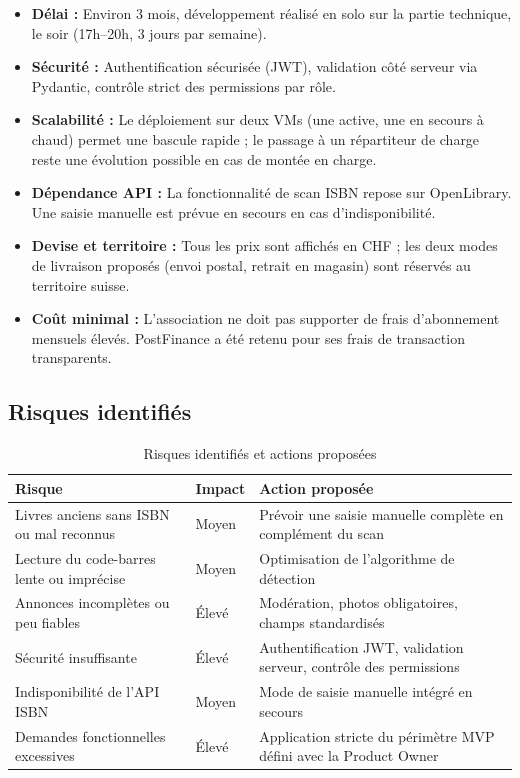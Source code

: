\documentclass[12pt, a4paper]{report}
\renewcommand{\_}{\origunderscore\allowbreak}
\begin{document}
\begin{itemize}
    \item \textbf{Délai :} Environ 3 mois, développement réalisé en solo sur la partie technique, le soir (17h–20h, 3 jours par semaine).
    \item \textbf{Sécurité :} Authentification sécurisée (JWT), validation côté serveur via Pydantic, contrôle strict des permissions par rôle.
    \item \textbf{Scalabilité :} Le déploiement sur deux VMs (une active, une en secours à chaud) permet une bascule rapide ; le passage à un répartiteur de charge reste une évolution possible en cas de montée en charge.
    \item \textbf{Dépendance API :} La fonctionnalité de scan ISBN repose sur OpenLibrary. Une saisie manuelle est prévue en secours en cas d'indisponibilité.
    \item \textbf{Devise et territoire :} Tous les prix sont affichés en CHF ; les deux modes de livraison proposés (envoi postal, retrait en magasin) sont réservés au territoire suisse.
    \item \textbf{Coût minimal :} L'association ne doit pas supporter de frais d'abonnement mensuels élevés. PostFinance a été retenu pour ses frais de transaction transparents.
\end{itemize}

\subsection{Risques identifiés}

\begin{table}[h]
\centering
\renewcommand{\arraystretch}{1.4}
\begin{tabular}{@{}p{4cm}p{2.5cm}p{6.5cm}@{}}
\toprule
\textbf{Risque} & \textbf{Impact} & \textbf{Action proposée} \\
\midrule
Livres anciens sans ISBN ou mal reconnus & Moyen & Prévoir une saisie manuelle complète en complément du scan \\
Lecture du code-barres lente ou imprécise & Moyen & Optimisation de l'algorithme de détection \\
Annonces incomplètes ou peu fiables & Élevé & Modération, photos obligatoires, champs standardisés \\
Sécurité insuffisante & Élevé & Authentification JWT, validation serveur, contrôle des permissions \\
Indisponibilité de l'API ISBN & Moyen & Mode de saisie manuelle intégré en secours \\
Demandes fonctionnelles excessives & Élevé & Application stricte du périmètre MVP défini avec la Product Owner \\
\bottomrule
\end{tabular}
\caption{Risques identifiés et actions proposées}
\label{tab:risques}
\end{table}
\end{document}

